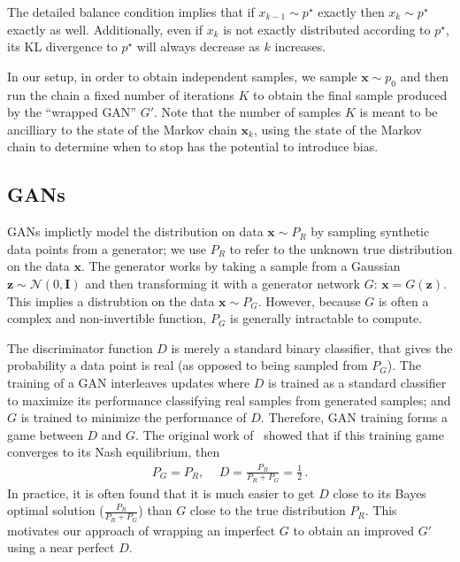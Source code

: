\documentclass{article}
\renewcommand{\vec}[1]{{\boldsymbol{\mathbf{#1}}}} %
\newcommand{\mat}[1]{{\ensuremath{\mathbf{#1}}}} %
\newcommand{\sample}{\sim}
\newcommand{\norm}{\mathcal{N}}
\newcommand{\target}{{p^\star}}
\newcommand{\pinit}{{p_0}}
\begin{document}
The detailed balance condition implies that if $x_{k-1} \sample \target$ exactly then $x_k \sample \target$ exactly as well.
Additionally, even if $x_k$ is not exactly distributed according to $\target$, its KL divergence to $\target$ will always decrease as $k$ increases.  %

In our setup, in order to obtain independent samples, we sample $\vec x \sample \pinit$ and then run the chain a fixed number of iterations $K$ to obtain the final sample produced by the ``wrapped GAN'' $G'$.
Note that the number of samples $K$ is meant to be ancilliary to the state of the Markov chain $\vec x_k$, using the state of the Markov chain to determine when to stop has the potential to introduce bias.  %

\subsection{GANs}

GANs implictly model the distribution on data $\vec x \sample P_R$ by sampling synthetic data points from a generator; we use $P_R$ to refer to the unknown true distribution on the data $\vec x$.
The generator works by taking a sample from a Gaussian $\vec z \sample \norm(0,\mat I)$ and then transforming it with a generator network $G$: $\vec x = G(\vec z)$.
This implies a distrubtion on the data $\vec x \sample P_G$.  %
However, because $G$ is often a complex and non-invertible function, $P_G$ is generally intractable to compute.

The discriminator function $D$ is merely a standard binary classifier, that gives the probability a data point is real (as opposed to being sampled from $P_G$)\@.
The training of a GAN interleaves updates where $D$ is trained as a standard classifier to maximize its performance classifying real samples from generated samples; and $G$ is trained to minimize the performance of $D$.
Therefore, GAN training forms a game between $D$ and $G$.
The original work of~\citet{} showed that if this training game converges to its Nash equilibrium, then
\begin{align}
  P_G = P_R,\, \quad D = \frac{P_R}{P_R + P_G} = \frac{1}{2}\,.
\end{align}
In practice, it is often found that it is much easier to get $D$ close to its Bayes optimal solution ($\tfrac{P_R}{P_R + P_G}$) than $G$ close to the true distribution $P_R$.
This motivates our approach of wrapping an imperfect $G$ to obtain an improved $G'$ using a near perfect $D$.
\end{document}
